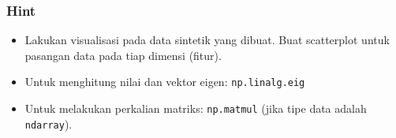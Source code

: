 \documentclass[bahasa,11pt,aspectratio=169]{beamer}
\begin{document}
\begin{frame}
\frametitle{Hint}
\begin{itemize}
\item Lakukan visualisasi pada data sintetik yang dibuat. Buat scatterplot
untuk pasangan data pada tiap dimensi (fitur).
\item Untuk menghitung nilai dan vektor eigen: \texttt{np.linalg.eig}
\item Untuk melakukan perkalian matriks: \texttt{np.matmul} (jika tipe data adalah
\texttt{ndarray}).
\end{itemize}
\end{frame}
\end{document}
